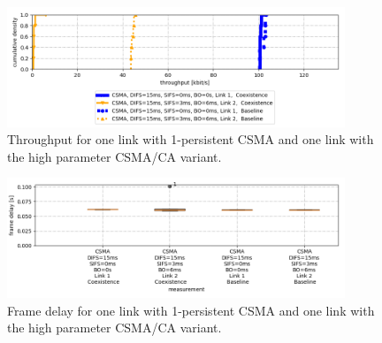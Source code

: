 \begin{figure}[tb]
	\label{fig:results-difs-only-csma-throughput}
	\begin{center}
		\includegraphics[width=0.9\textwidth]{pictures/results/different_combinations/difs_only_csma/throughput_cdf}
	\end{center}
	\caption{Throughput for one link with 1-persistent CSMA and one link with the high parameter CSMA/CA variant.}
\end{figure}

\begin{figure}[tb]
	\label{fig:results-difs-only-csma-frame-delay}
	\begin{center}
		\includegraphics[width=0.9\textwidth]{pictures/results/different_combinations/difs_only_csma/frame_delay_boxplot}
	\end{center}
	\caption{Frame delay for one link with 1-persistent CSMA and one link with the high parameter CSMA/CA variant.}
\end{figure}

